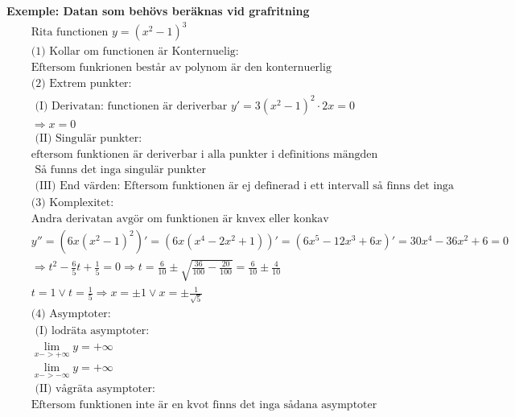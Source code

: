\textbf{Exemple: Datan som behövs beräknas vid grafritning}
\begin{align*}
  &\quad  \text{Rita functionen } y={(x^2-1)}^3 \\
  &\quad  \text{(1) Kollar om functionen är Konternuelig:} \\
  &\quad  \text{Eftersom funkrionen består av polynom är den konternuerlig}   \\
  &\quad  \text{(2) Extrem punkter: }   \\
  &\quad  \text{ (I) Derivatan: functionen är deriverbar } y'=3{(x^2-1)}^2 \cdot 2x=0 \\
  &\quad  \Rightarrow x=0  \\
  &\quad  \text{ (II) Singulär punkter:} \\
  &\quad  \text{eftersom funktionen är deriverbar i alla punkter i definitions mängden } \\
  &\quad  \text{ Så funns det inga singulär punkter} \\
  &\quad  \text{ (III) End värden: Eftersom funktionen är ej definerad i ett intervall så finns det inga } \\
  &\quad  \text{(3) Komplexitet: } \\
  &\quad  \text{Andra derivatan avgör om funktionen är knvex eller konkav} \\
  &\quad  y''=(6x{(x^2-1)}^2)'= (6x{(x^4-2x^2+1)})' = (6x^5-12x^3+6x)' = 30x^4-36x^2+6 = 0 \\
  &\quad  \Rightarrow t^2-\frac{6}{5}t+\frac{1}{5}=0 \Rightarrow t=\frac{6}{10}\pm
  \sqrt{\frac{36}{100}-\frac{20}{100}} = \frac{6}{10} \pm \frac{4}{10}  \\
  &\quad  t=1 \lor t=\frac{1}{5} \Rightarrow x=\pm1 \lor x=\pm\frac{1}{\sqrt{5}}  \\
  &\quad  \text{(4) Asymptoter: } \\
  &\quad  \text{ (I) lodräta asymptoter: }  \\
  &\quad  \lim_{x->+\infty}y=+\infty \\
  &\quad  \lim_{x->-\infty}y=+\infty \\
  &\quad  \text{ (II) vågräta asymptoter:} \\
  &\quad  \text{Eftersom funktionen inte är en kvot finns det inga sådana asymptoter }  \\
\end{align*}
